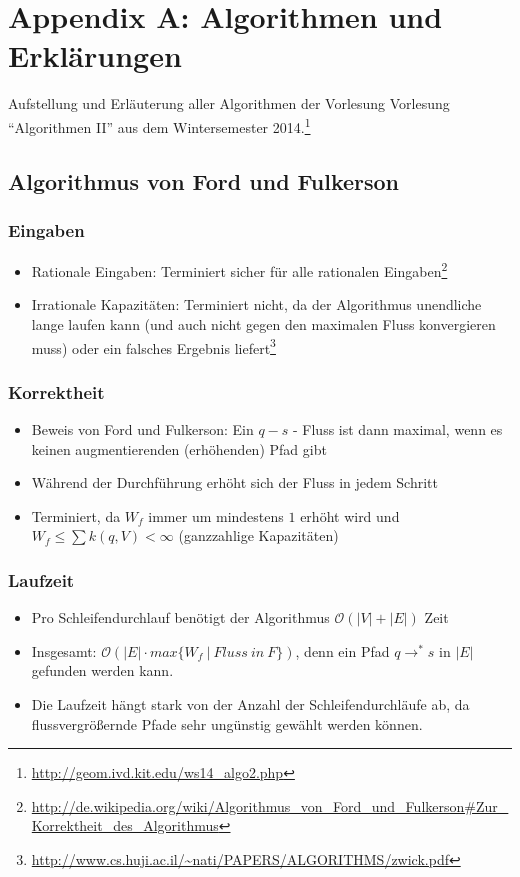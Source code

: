 \section{Appendix A: Algorithmen und Erklärungen}

Aufstellung und Erläuterung aller Algorithmen der Vorlesung Vorlesung "`Algorithmen II"' aus dem Wintersemester 2014.\footnote{\url{http://geom.ivd.kit.edu/ws14_algo2.php}}

\subsection{Algorithmus von Ford und Fulkerson}


\subsubsection{Eingaben}
\begin{itemize}
	\item Rationale Eingaben: Terminiert sicher für alle rationalen Eingaben\footnote{\url{http://de.wikipedia.org/wiki/Algorithmus_von_Ford_und_Fulkerson\#Zur_Korrektheit_des_Algorithmus}}
	\item Irrationale Kapazitäten: Terminiert nicht, da der Algorithmus unendliche lange laufen kann (und auch nicht gegen den maximalen Fluss konvergieren muss) oder ein falsches Ergebnis liefert\footnote{\url{http://www.cs.huji.ac.il/~nati/PAPERS/ALGORITHMS/zwick.pdf}}
\end{itemize}

\subsubsection{Korrektheit}
\begin{itemize}
	\item Beweis von Ford und Fulkerson: Ein \(q-s\) - Fluss ist dann maximal, wenn es keinen augmentierenden (erhöhenden) Pfad gibt
	\item Während der Durchführung erhöht sich der Fluss in jedem Schritt
	\item Terminiert, da \(W_f\) immer um mindestens \(1\) erhöht wird und \(W_f \leq \sum k(q,V) < \infty\) (ganzzahlige Kapazitäten)
\end{itemize}

\subsubsection{Laufzeit}
\begin{itemize}
	\item Pro Schleifendurchlauf benötigt der Algorithmus \(\mathcal{O}(|V|+|E|)\) Zeit
	\item Insgesamt: \(\mathcal{O}(|E| \cdot max\{W_f~|~Fluss~in~F\})\), denn ein Pfad \(q \rightarrow^* s\) in \(|E|\) gefunden werden kann.
	\item Die Laufzeit hängt stark von der Anzahl der Schleifendurchläufe ab, da flussvergrößernde Pfade sehr ungünstig gewählt werden können.
\end{itemize}


